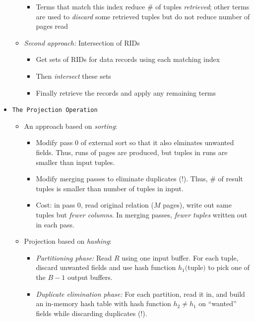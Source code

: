 \documentclass[landscape,8pt]{extarticle}
\newcommand{\code}{\lstinline}
\begin{document}
\begin{multicols}{5}
\begin{itemize}
\begin{itemize}
\begin{itemize}
                            \item Terms that match this index reduce \# of tuples \emph{retrieved}; other terms are used to \emph{discard} some retrieved tuples but do not reduce number of pages read
                        \end{itemize}
                  \item \emph{Second approach:} Intersection of RIDs
                        \begin{itemize}
                            \item Get sets of RIDs for data records using each matching index
                            \item Then \emph{intersect} these sets
                            \item Finally retrieve the records and apply any remaining terms
                        \end{itemize}
              \end{itemize}
        \item \code{The Projection Operation}
              \begin{itemize}
                  \item An approach based on \emph{sorting}:
                        \begin{itemize}
                            \item Modify pass 0 of external sort so that it also elminates unwanted fields. Thus, runs of pages are produced, but tuples in runs are smaller than input tuples.
                            \item Modify merging passes to eliminate duplicates (!). Thus, \# of result tuples is smaller than number of tuples in input.
                            \item Cost: in pass 0, read original relation ($M$ pages), write out same tuples but \emph{fewer columns}. In merging passes, \emph{fewer tuples} written out in each pass.
                        \end{itemize}
                  \item Projection based on \emph{hashing}:
                        \begin{itemize}
                            \item \emph{Partitioning phase:} Read $R$ using one input buffer. For each tuple, discard unwanted fields and use hash function $h_1 ($tuple$)$ to pick one of the $B-1$ output buffers.
                            \item \emph{Duplicate elimination phase:} For each partition, read it in, and build an in-memory hash table with hash function $h_2 \neq h_1$ on ``wanted'' fields while discarding duplicates (!).

\end{itemize}
\end{itemize}
\end{itemize}
\end{multicols}
\end{document}
